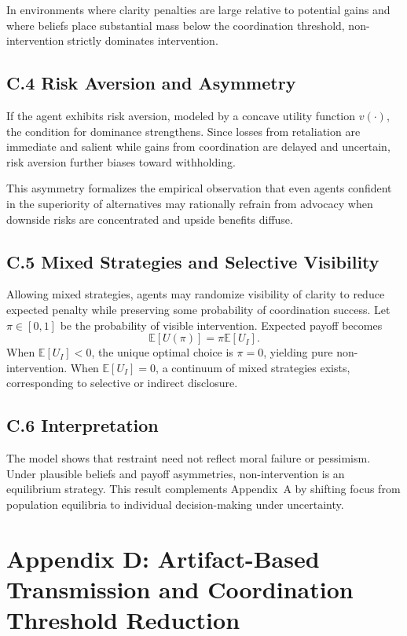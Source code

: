 \documentclass[11pt]{article}
\begin{document}
In environments where clarity penalties are large relative to potential gains and where beliefs place substantial mass below the coordination threshold, non-intervention strictly dominates intervention.

\subsection{C.4 Risk Aversion and Asymmetry}

If the agent exhibits risk aversion, modeled by a concave utility function \(v(\cdot)\), the condition for dominance strengthens. Since losses from retaliation are immediate and salient while gains from coordination are delayed and uncertain, risk aversion further biases toward withholding.

This asymmetry formalizes the empirical observation that even agents confident in the superiority of alternatives may rationally refrain from advocacy when downside risks are concentrated and upside benefits diffuse.

\subsection{C.5 Mixed Strategies and Selective Visibility}

Allowing mixed strategies, agents may randomize visibility of clarity to reduce expected penalty while preserving some probability of coordination success. Let \(\pi\in[0,1]\) be the probability of visible intervention. Expected payoff becomes
\[
\mathbb{E}[U(\pi)] = \pi \mathbb{E}[U_I].
\]
When \(\mathbb{E}[U_I]<0\), the unique optimal choice is \(\pi=0\), yielding pure non-intervention. When \(\mathbb{E}[U_I]=0\), a continuum of mixed strategies exists, corresponding to selective or indirect disclosure.

\subsection{C.6 Interpretation}

The model shows that restraint need not reflect moral failure or pessimism. Under plausible beliefs and payoff asymmetries, non-intervention is an equilibrium strategy. This result complements Appendix~A by shifting focus from population equilibria to individual decision-making under uncertainty.

\section{Appendix D: Artifact-Based Transmission and Coordination Threshold Reduction}
\label{app:artifact}
\end{document}
